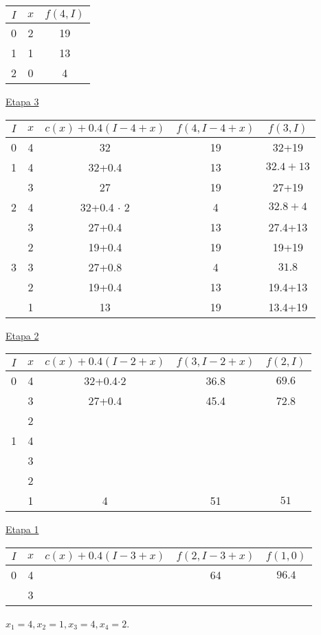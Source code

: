 \documentclass[twoside]{article}
\begin{document}
\begin{ejercicio}{3}
\begin{solucion}
\begin{center}
\begin{tabular}{|c| c| c|}
\hline
$I$ & $x$ & $f(4,I)$\\
\hline
0 & 2 & 19\\
\hline
1 & 1 & 13\\
\hline
2 & 0 & 4\\
\hline
\end{tabular}
\end{center}
\underline{Etapa 3}
\begin{center}
\begin{tabular}{|c| c| c|c|c|}
\hline
$I$ & $x$ & $c(x)+0.4(I-4+x)$ & $f(4,I-4+x)$ & $f(3,I)$\\
\hline
0 & 4 & 32 & 19 & 32+19\\
\hline
\hline
1 & 4 & 32+0.4 & 13 & $\boxed{32.4+13}$\\
\hline
 & 3 & 27 & 19 & 27+19\\
\hline
\hline
2 & 4 & 32+0.4 $\cdot$ 2 & 4 & $\boxed{32.8+4}$\\
\hline
  & 3 & 27+0.4 & 13 & 27.4+13\\
  \hline
  & 2 & 19+0.4 & 19 & 19+19\\
  \hline
  \hline
3 & 3 & 27+0.8 & 4 & $\boxed{31.8}$\\
\hline
 &  2 & 19+0.4 & 13 & 19.4+13\\
 \hline
 & 1 & 13 & 19 & 13.4+19\\
 \hline
\end{tabular}
\end{center}
\underline{Etapa 2}
\begin{center}
\begin{tabular}{|c|c|c|c|c|}
\hline
$I$ & $x$ & $c(x)+0.4(I-2+x)$ & $f(3,I-2+x)$ & $f(2,I)$\\
\hline
0 & 4 & 32+0.4$\cdot$2 & 36.8 & $\boxed{69.6}$\\
  & 3 &     27+0.4          &    45.4     &72.8 \\
  & 2 &                &        & \\
\hline
\hline
1 & 4  &   &    & \\
  & 3 &   &     & \\
  & 2 &   &    & \\
  & 1 & 4 & 51 & $\boxed{51}$\\
  \hline
\end{tabular}
\end{center}
\underline{Etapa 1}
\begin{center}
\begin{tabular}{|c|c|c|c|c|}
\hline
$I$ & $x$ & $c(x)+0.4(I-3+x)$ & $f(2,I-3+x)$ & $f(1,0)$\\
\hline
0 & 4 &  & 64 & $\boxed{96.4}$\\
  & 3 &                &       & \\
\hline
\end{tabular}
\end{center}
$x_1=4, x_2=1, x_3=4, x_4=2$.
\end{solucion}
\end{ejercicio}	
\end{document}
